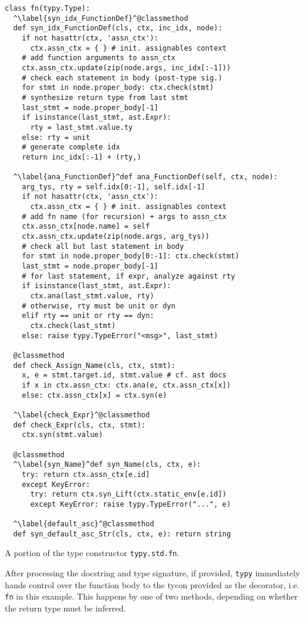 \documentclass[preprint,10pt]{sigplanconf}
\newcommand{\lip}[1]{\lstinline[language=Python,basicstyle=\ttfamily\small,deletendkeywords={tuple,buffer,map}]{#1}}
\begin{document}
\begin{codelisting}[t]
\begin{lstlisting}
class fn(typy.Type):
  ^\label{syn_idx_FunctionDef}^@classmethod
  def syn_idx_FunctionDef(cls, ctx, inc_idx, node):
    if not hasattr(ctx, 'assn_ctx'): 
      ctx.assn_ctx = { } # init. assignables context
    # add function arguments to assn_ctx
    ctx.assn_ctx.update(zip(node.args, inc_idx[:-1]))
    # check each statement in body (post-type sig.)
    for stmt in node.proper_body: ctx.check(stmt)
    # synthesize return type from last stmt
    last_stmt = node.proper_body[-1]
    if isinstance(last_stmt, ast.Expr): 
      rty = last_stmt.value.ty
    else: rty = unit
    # generate complete idx
    return inc_idx[:-1] + (rty,)

  ^\label{ana_FunctionDef}^def ana_FunctionDef(self, ctx, node):
    arg_tys, rty = self.idx[0:-1], self.idx[-1]
    if not hasattr(ctx, 'assn_ctx'): 
      ctx.assn_ctx = { } # init. assignables context
    # add fn name (for recursion) + args to assn_ctx
    ctx.assn_ctx[node.name] = self
    ctx.assn_ctx.update(zip(node.args, arg_tys))
    # check all but last statement in body
    for stmt in node.proper_body[0:-1]: ctx.check(stmt)
    last_stmt = node.proper_body[-1]
    # for last statement, if expr, analyze against rty
    if isinstance(last_stmt, ast.Expr): 
      ctx.ana(last_stmt.value, rty)
    # otherwise, rty must be unit or dyn
    elif rty == unit or rty == dyn: 
      ctx.check(last_stmt)
    else: raise typy.TypeError("<msg>", last_stmt)

  @classmethod
  def check_Assign_Name(cls, ctx, stmt):
    x, e = stmt.target.id, stmt.value # cf. ast docs
    if x in ctx.assn_ctx: ctx.ana(e, ctx.assn_ctx[x])
    else: ctx.assn_ctx[x] = ctx.syn(e)

  ^\label{check_Expr}^@classmethod
  def check_Expr(cls, ctx, stmt):
    ctx.syn(stmt.value)
    
  @classmethod
  ^\label{syn_Name}^def syn_Name(cls, ctx, e):
    try: return ctx.assn_ctx[e.id]
    except KeyError:
      try: return ctx.syn_Lift(ctx.static_env[e.id])
      except KeyError: raise typy.TypeError("...", e)
  
  ^\label{default_asc}^@classmethod
  def syn_default_asc_Str(cls, ctx, e): return string
\end{lstlisting}
\caption{A portion of the type constructor \texttt{typy.std.fn}.}
\label{fn-top}
\end{codelisting}
After processing the docstring and type signature, if provided, \verb|typy| immediately hands control over the function body to the tycon provided as the decorator, i.e. \lip{fn} in this example. This happens by one of two methods, depending on whether the return type must be inferred.
\end{document}
